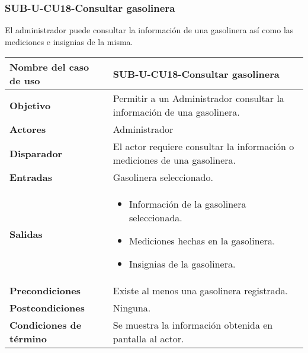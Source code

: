 \subsubsection{SUB-U-CU18-Consultar gasolinera}\label{SUB-U-CU18}
El administrador puede consultar la información de una gasolinera así como las mediciones e insignias de la misma.
\begin{longtable}{|J{5cm}|J{10.3cm}|}
	\hline
	\textbf{Nombre del caso de uso} &
		SUB-U-CU18-Consultar gasolinera \\ \hline
	\textbf{Objetivo} &
		Permitir a un Administrador consultar la información de una gasolinera. \\ \hline
	\textbf{Actores} &
		Administrador \\ \hline 
	\textbf{Disparador} & 
		El actor requiere consultar la información o mediciones de una gasolinera. \\ \hline 
	\textbf{Entradas} & Gasolinera seleccionado.
		\\ \hline 
	\textbf{Salidas} & 
		\begin{itemize}
			\item Información de la gasolinera seleccionada.
			\item Mediciones hechas en la gasolinera.
			\item Insignias de la gasolinera.
		\end{itemize} 
		\\ \hline
	\textbf{Precondiciones} & Existe al menos una gasolinera registrada.
		\\ \hline
	\textbf{Postcondiciones} & Ninguna.
		\\ \hline
	\textbf{Condiciones de término} & Se muestra la información obtenida en pantalla al actor.

\end{longtable}
